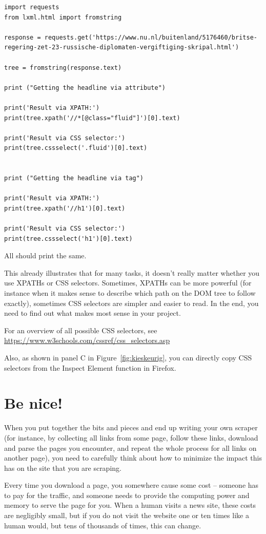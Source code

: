 \documentclass[a4paper,12pt]{book}
\begin{document}
\begin{lstlisting}
import requests
from lxml.html import fromstring

response = requests.get('https://www.nu.nl/buitenland/5176460/britse-regering-zet-23-russische-diplomaten-vergiftiging-skripal.html')

tree = fromstring(response.text)

print ("Getting the headline via attribute")

print('Result via XPATH:')
print(tree.xpath('//*[@class="fluid"]')[0].text)

print('Result via CSS selector:')
print(tree.cssselect('.fluid')[0].text)


print ("Getting the headline via tag")

print('Result via XPATH:')
print(tree.xpath('//h1')[0].text)

print('Result via CSS selector:')
print(tree.cssselect('h1')[0].text)

\end{lstlisting}

All should print the same.

This already illustrates that for many tasks, it doesn't really matter whether you use XPATHs or CSS selectors. Sometimes, XPATHs can be more powerful (for instance when it makes sense to describe which path on the DOM tree to follow exactly), sometimes CSS selectors are simpler and easier to read. 
In the end, you need to find out what makes most sense in your project.

For an overview of all possible CSS selectors, see
\url{https://www.w3schools.com/cssref/css_selectors.asp}

Also, as shown in panel C in Figure~\ref{fig:kieskeurig}, you can directly copy CSS selectors from the Inspect Element function in Firefox.


\section{Be nice!}
\label{sec:benice}

When you put together the bits and pieces and end up writing your own scraper (for instance, by collecting all links from some page, follow these links, download and parse the pages you encounter, and repeat the whole process for all links on another page), you need to carefully think about how to minimize the impact this has on the site that you are scraping.

Every time you download a page, you somewhere cause some cost -- someone has to pay for the traffic, and someone needs to provide the computing power and memory to serve the page for you. When a human visits a news site, these costs are negligibly small, but if you do not visit the website one or ten times like a human would, but tens of thousands of times, this can change. 
\end{document}
